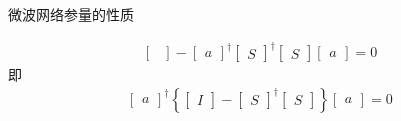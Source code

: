 \begin{frame}{微波网络参量的性质}
\begin{enumerate}
\begin{align*}
\begin{bmatrix*}
                  \end{bmatrix*}
                  -
                  \begin{bmatrix*}
                      a
                  \end{bmatrix*}^\dagger
                  \begin{bmatrix*}
                      S
                  \end{bmatrix*}^\dagger
                  \begin{bmatrix*}
                      S
                  \end{bmatrix*}
                  \begin{bmatrix*}
                      a
                  \end{bmatrix*}
                  =0
              \end{align*}
              即
              \begin{gather*}
                  \begin{bmatrix*}
                      a
                  \end{bmatrix*}^\dagger
                  \left\{
                  \begin{bmatrix*}
                      I
                  \end{bmatrix*}
                  -
                  \begin{bmatrix*}
                      S
                  \end{bmatrix*}^\dagger
                  \begin{bmatrix*}
                      S
                  \end{bmatrix*}
                  \right\}
                  \begin{bmatrix*}
                      a
                  \end{bmatrix*}
                  =0
              \end{gather*}
    \end{enumerate}
\end{frame}

